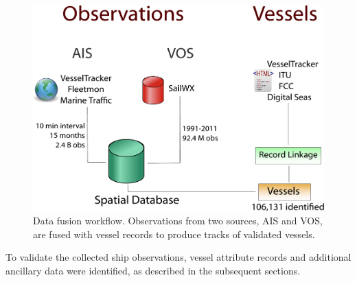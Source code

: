 \begin{figure}
  \centering
  \includegraphics[width=130mm]{figures/record-workflow-myriad.pdf}
  \caption[Data fusion workflow]{Data fusion workflow. Observations from two sources, AIS and VOS, are fused with vessel records to produce tracks of validated vessels.}
  \label{fig:record-workflow}
\end{figure}

To validate the collected ship observations, vessel attribute records and additional ancillary data were identified, as described in the subsequent sections.

